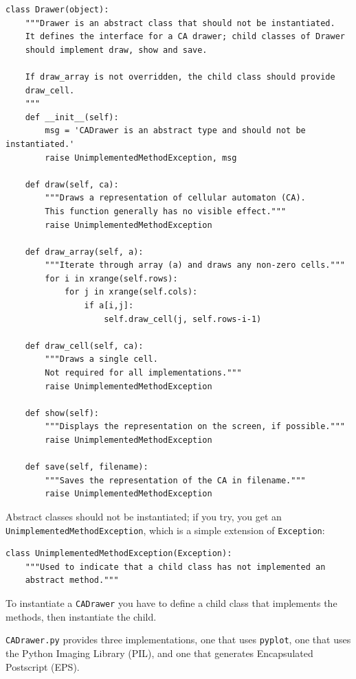 \documentclass[10pt]{book}
\begin{document}
\begin{verbatim}
class Drawer(object):
    """Drawer is an abstract class that should not be instantiated.
    It defines the interface for a CA drawer; child classes of Drawer
    should implement draw, show and save.

    If draw_array is not overridden, the child class should provide
    draw_cell.
    """
    def __init__(self):
        msg = 'CADrawer is an abstract type and should not be instantiated.'
        raise UnimplementedMethodException, msg

    def draw(self, ca):
        """Draws a representation of cellular automaton (CA).
        This function generally has no visible effect."""
        raise UnimplementedMethodException
    
    def draw_array(self, a):
        """Iterate through array (a) and draws any non-zero cells."""
        for i in xrange(self.rows):
            for j in xrange(self.cols):
                if a[i,j]:
                    self.draw_cell(j, self.rows-i-1)

    def draw_cell(self, ca):
        """Draws a single cell.
        Not required for all implementations."""
        raise UnimplementedMethodException
    
    def show(self):
        """Displays the representation on the screen, if possible."""
        raise UnimplementedMethodException

    def save(self, filename):
        """Saves the representation of the CA in filename."""
        raise UnimplementedMethodException
\end{verbatim}

Abstract classes should not be instantiated; if you try, you
get an {\tt UnimplementedMethodException}, which is a simple
extension of {\tt Exception}:

\begin{verbatim}
class UnimplementedMethodException(Exception):
    """Used to indicate that a child class has not implemented an
    abstract method."""
\end{verbatim}

To instantiate a {\tt CADrawer} you have to define a child class
that implements the methods, then instantiate the child.

{\tt CADrawer.py} provides three implementations, one that uses
{\tt pyplot}, one that uses the Python Imaging Library (PIL), and
one that generates Encapsulated Postscript (EPS).
\end{document}
